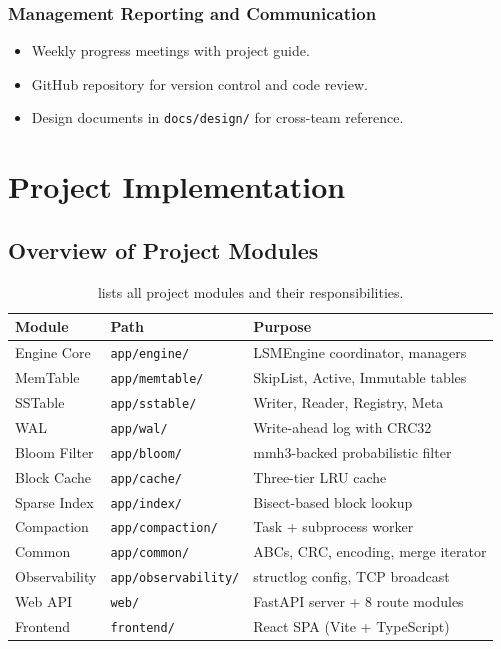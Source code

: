 \documentclass[oneside,a4paper,12pt]{book}
\begin{document}
\subsection{Management Reporting and Communication}
\begin{itemize}[leftmargin=2em]
    \item Weekly progress meetings with project guide.
    \item GitHub repository for version control and code review.
    \item Design documents in \texttt{docs/design/} for cross-team reference.
\end{itemize}


\chapter{Project Implementation}

\section{Overview of Project Modules}


\begin{table}[H]
\centering
\renewcommand{\arraystretch}{1.3}
\begin{tabularx}{\textwidth}{|X|X|X|}
\hline
\textbf{Module} & \textbf{Path} & \textbf{Purpose} \\
\hline
Engine Core & \texttt{app/engine/} & LSMEngine coordinator, managers \\
\hline
MemTable & \texttt{app/memtable/} & SkipList, Active, Immutable tables \\
\hline
SSTable & \texttt{app/sstable/} & Writer, Reader, Registry, Meta \\
\hline
WAL & \texttt{app/wal/} & Write-ahead log with CRC32 \\
\hline
Bloom Filter & \texttt{app/bloom/} & mmh3-backed probabilistic filter \\
\hline
Block Cache & \texttt{app/cache/} & Three-tier LRU cache \\
\hline
Sparse Index & \texttt{app/index/} & Bisect-based block lookup \\
\hline
Compaction & \texttt{app/compaction/} & Task + subprocess worker \\
\hline
Common & \texttt{app/common/} & ABCs, CRC, encoding, merge iterator \\
\hline
Observability & \texttt{app/observability/} & structlog config, TCP broadcast \\
\hline
Web API & \texttt{web/} & FastAPI server + 8 route modules \\
\hline
Frontend & \texttt{frontend/} & React SPA (Vite + TypeScript) \\
\hline
\end{tabularx}
\caption{lists all project modules and their responsibilities.}
\label{tab:modules}
\end{table}
\end{document}
